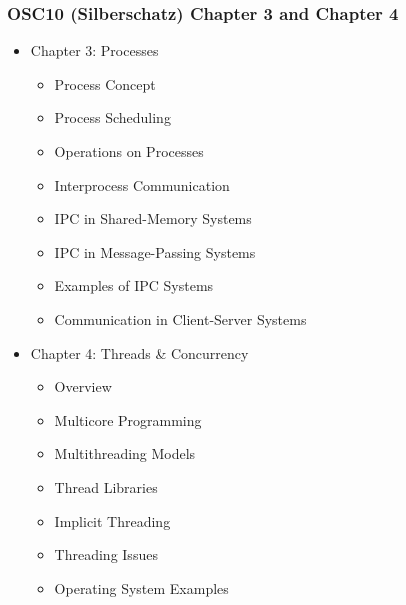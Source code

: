 \documentclass[aspectratio=169, xcolor=table, notheorems, hyperref={pdfpagelabels=false}]{beamer}
\begin{document}
\begin{frame}
\frametitle{OSC10 (Silberschatz) Chapter 3 and Chapter 4}
\begin{multicols}{2}
  \begin{itemize}
  \item Chapter 3: Processes 
  \begin{itemize}
  \item Process Concept
  \item Process Scheduling
  \item Operations on Processes
  \item Interprocess Communication
  \item IPC in Shared-Memory Systems
  \item IPC in Message-Passing Systems
  \item Examples of IPC Systems
  \item Communication in Client-Server Systems
  \end{itemize}
  \end{itemize}
  \vfill \null
\columnbreak
  \begin{itemize}
  \item Chapter 4: Threads \& Concurrency
  \begin{itemize}
  \item Overview
  \item Multicore Programming
  \item Multithreading Models
  \item Thread Libraries
  \item Implicit Threading
  \item Threading Issues
  \item Operating System Examples
  \end{itemize}
  \end{itemize}
  \vfill \null
\end{multicols}
\end{frame}

\end{document}
